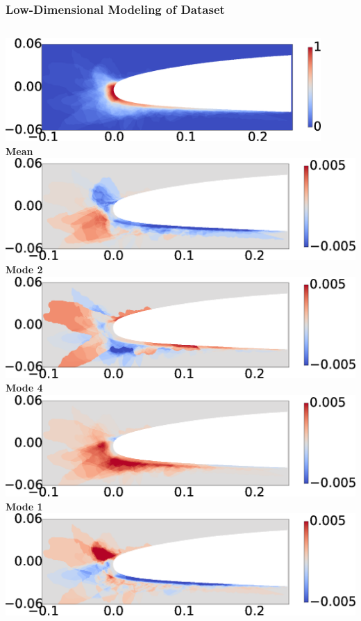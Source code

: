 \documentclass[9pt]{beamer}
\begin{document}
\begin{frame}
\frametitle{Low-Dimensional Modeling of Dataset}
\label{sec-4-2}


\begin{columns}[c]
    \centering
    \hspace{-2.17em}
    \includegraphics[width=0.9\textwidth]{MEAN.png} \\
    {\bf Mean} \\
    \includegraphics[width=1\textwidth]{MODE2.png} \\
    {\bf Mode 2} \\
    \includegraphics[width=1\textwidth]{MODE4.png} \\
    {\bf Mode 4}
    \centering
    \includegraphics[width=1\textwidth]{MODE1.png} \\
    {\bf Mode 1} \\
    \includegraphics[width=1\textwidth]{MODE3.png} \\

\end{columns}
\end{frame}
\end{document}
